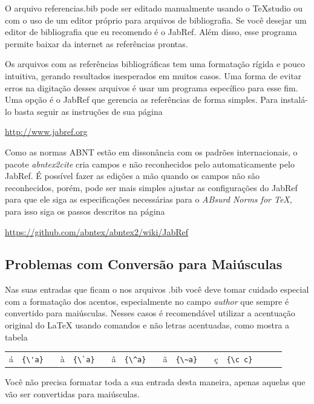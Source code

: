 \begin{apendicesenv}
    O arquivo {\color{red} referencias.bib} pode ser editado manualmente usando o
    TeXstudio ou com o uso de um editor próprio para arquivos de bibliografia.
    Se você desejar um editor de bibliografia que eu recomendo é o JabRef.
    Além disso, esse programa permite baixar da internet as referências prontas.

    Os arquivos com as referências bibliográficas tem uma formatação rígida e pouco intuitiva, gerando resultados inesperados em muitos casos. Uma forma de evitar erros na digitação desses arquivos é usar um programa específico para esse fim. Uma opção é o JabRef que gerencia as referências de forma simples. Para instalá-lo basta seguir as instruções de sua página
    \begin{center}
        \url{http://www.jabref.org}
    \end{center}

    Como as normas ABNT estão em dissonância com os padrões internacionais,
    o pacote \textit{abntex2cite} cria campos e não reconhecidos pelo automaticamente
    pelo JabRef.
    É possível fazer as edições a mão quando os campos não são reconhecidos,
    porém, pode ser mais simples ajustar as configurações do JabRef para que
    ele siga as especificações necessárias para o \textit{ABsurd Norms for TeX},
    para isso siga os passos descritos na página
    \begin{center}
        \url{https://github.com/abntex/abntex2/wiki/JabRef}
    \end{center}

    \subsection{Problemas com Conversão para Maiúsculas}

    Nas suas entradas que ficam o nos arquivos {\color{red} .bib}
    você deve tomar cuidado especial com a formatação dos acentos,
    especialmente no campo \textit{author} que sempre é convertido para maiúsculas.
    Nesses casos é recomendável utilizar a acentuação original do \LaTeX{}
    usando comandos e não letras acentuadas, como mostra a tabela

    \begin{center}
        \begin{tabular}{clcclcclcclcclccl}
            á & \verb!{\'a}! &  &
            à & \verb!{\`a}! &  &
            â & \verb!{\^a}! &  &
            ã & \verb!{\~a}! &  &
            ç & \verb!{\c c}!
        \end{tabular}
    \end{center}

    Você não precisa formatar toda a sua entrada desta maneira,
    apenas aquelas que vão ser convertidas para maiúsculas.

\end{apendicesenv}
